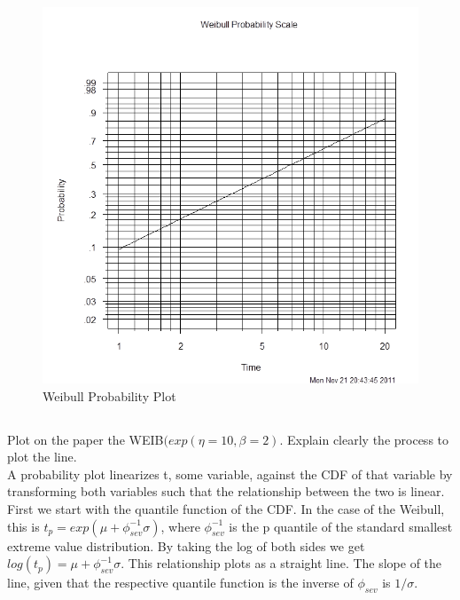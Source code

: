 \documentclass{article}
\begin{document}
\FloatBarrier
\begin{figure}
  \centering
  \includegraphics[width = 5in]{weibull_graph_1.png}
  \caption{Weibull Probability Plot}
\end{figure}
\FloatBarrier

\subsection{}
Plot on the paper the WEIB\begin{math}(exp(\eta = 10, \beta = 2).\end{math}
Explain clearly the process to plot the line.\\

A probability plot linearizes t, some variable, against the CDF of that variable by transforming both variables such that the relationship between the two is linear.  First we start with the quantile function of the CDF.  In the case of the Weibull, this is \(t_p = exp(\mu + \phi_{sev}^{-1} \sigma)\), where \(\phi_{sev}^{-1}\) is the p quantile of the standard smallest extreme value distribution.  By taking the log of both sides we get \(log(t_p) = \mu + \phi_{sev}^{-1} \sigma\).  This relationship plots as a straight line.  The slope of the line, given that the respective quantile function is the inverse of  \(\phi_{sev}\) is \(1/\sigma\).\\
\end{document}

